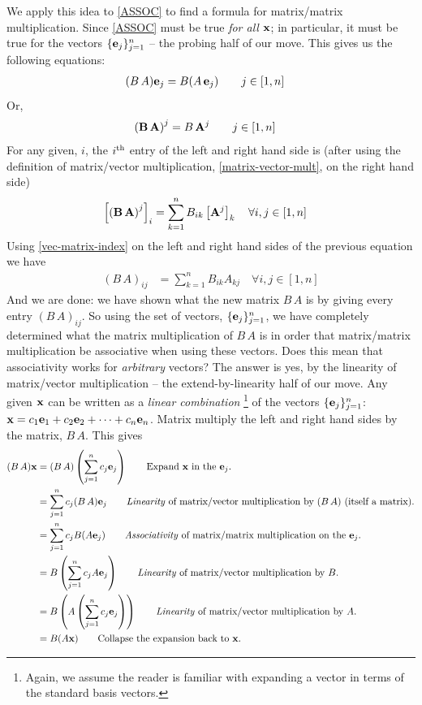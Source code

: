 \documentclass{article}
\begin{document}
We apply this idea to \eqref{ASSOC} to find a formula for matrix/matrix multiplication.
Since \eqref{ASSOC} must be true {\em for all\/} ${\bf x}$; in particular, it must be
true for the vectors $\{{\bf e}_j\}_{j=1}^n$ -- the probing half of our move.
This gives us the following equations:
\begin{align}
	(B \, A) {\bf e}_j &= B (A \, {\bf e}_j) \quad\quad \text{$j \in [1,n]$} 
\end{align}
Or,
\begin{align}
	{\bf (B \, A)}^j &= B \, {\bf A}^j \quad\quad \text{$j \in [1, n]$}
\end{align}
For any given, $i$, the $i^{\rm th}$ entry of the left and right hand side is
(after using the definition of matrix/vector 
multiplication, \eqref{matrix-vector-mult}, on the right hand side)
\begin{align}
	\left[{\bf (B \, A)}^j\right]_i &= \sum_{k=1}^n B_{ik} \left[{\bf A}^j\right]_k \quad \forall i, j \in [1, n]
\end{align}
Using \eqref{vec-matrix-index} on the left and right hand sides of the previous equation we have
\begin{align}
	(B \, A)_{ij} &= \sum_{k=1}^n B_{ik} A_{kj} \quad \forall i, j \in [1, n]
\end{align}
And we are done: we have shown what the new matrix $B \, A$ is by giving every entry $(B\, A)_{ij}$.
So using the set of vectors, $\{{\bf e}_j\}_{j=1}^n$, we have completely determined what 
the matrix multiplication of $B \, A$ is in order that matrix/matrix multiplication be 
associative when using these vectors. Does this mean that associativity works for 
{\em arbitrary\/} vectors? The answer is yes, by the linearity of
matrix/vector multiplication -- the extend-by-linearity half of our move. Any given ${\bf x}$ can be written as a {\em linear combination\/}%
\footnote{Again, we assume the reader is familiar with expanding a vector in terms of the standard basis vectors.}
of the vectors $\{{\bf e}_j\}_{j=1}^n$: ${\bf x} = c_1 {\bf e}_1 + c_2 {\bf e}_2 + \cdots + c_n {\bf e}_n$.
Matrix multiply the left and right hand sides by the matrix, $B\,A$. This gives
\begin{align}
	(B\, A){\bf x} &= (B \, A)\left(\sum_{j=1}^n c_j {\bf e}_j\right) \quad\quad \text{Expand ${\bf x}$ in the ${\bf e}_j$.}\nonumber \\
				   &=\sum_{j=1}^n c_j (B \, A){\bf e}_j \quad\quad \text{{\em Linearity\/} of matrix/vector multiplication by $(B \, A)$ (itself a matrix).}\nonumber \\
				   &=\sum_{j=1}^n c_j B (A{\bf e}_j) \quad\quad \text{{\em Associativity\/} of matrix/matrix multiplication on the ${\bf e}_j$.}\nonumber \\
				   &=B\left(\sum_{j=1}^n c_j A{\bf e}_j\right) \quad\quad \text{{\em Linearity\/} of matrix/vector multiplication by $B$.}\nonumber \\
				   &=B\left( A\left(\sum_{j=1}^n c_j {\bf e}_j\right)\right) \quad\quad \text{{\em Linearity\/} of matrix/vector multiplication by  $A$.}\nonumber \\
				   &=B( A {\bf x}) \quad\quad \text{Collapse the expansion back to ${\bf x}$.}
\end{align}
\end{document}
